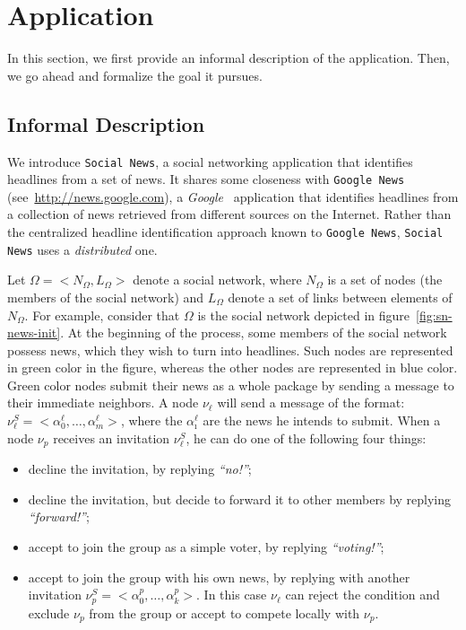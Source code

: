 \section{Application} %
\label{sec:application}

In this section, we first provide an informal description of the application. Then, we go ahead and formalize the goal it
pursues.

\subsection{Informal Description} %
\label{sub:informal_description}

We introduce {\tt Social News}, a social networking application that identifies headlines from a set of news. It shares
some closeness with {\tt Google News} (see~\url{http://news.google.com}), a \emph{Google~\texttrademark} application that
identifies headlines from a collection of news retrieved from different sources on the Internet. Rather than the
centralized headline identification approach known to {\tt Google News}, {\tt Social News} uses a \emph{distributed} one.

Let $\Omega=<N_\Omega,L_\Omega>$ denote a social network, where $N_\Omega$ is a set of nodes (the members of the social
network) and $L_\Omega$ denote a set of links between elements of $N_\Omega$. For example, consider that $\Omega$ is the
social network depicted in figure~\ref{fig:sn-news-init}. At the beginning of the process, some members of the social
network possess news, which they wish to turn into headlines. Such nodes are represented in green color in the figure,
whereas the other nodes are represented in blue color. Green color nodes submit their news as a whole package by sending
a message to their immediate neighbors. A node $\nu_\ell$ will send a message of the format:
$\nu_\ell^S=<\alpha_0^\ell,\ldots,\alpha_m^\ell>$, where the $\alpha_\imath^\ell$ are the news he intends to submit. When
a node $\nu_p$ receives an invitation $\nu_\ell^S$, he can do one of the following four things:

\begin{itemize} 
	\item decline the invitation, by replying \emph{``no!''};
	\item decline the invitation, but decide to forward it to other members by replying \emph{``forward!''};
	\item accept to join the group as a simple voter, by replying \emph{``voting!''}; 
	\item accept to join the group with his own news, by replying with another invitation $\nu_p^S=<\alpha_0^p,\ldots,\alpha_k^p>$. In this case $\nu_\ell$ can reject the condition and exclude $\nu_p$
from the group or accept to compete locally with $\nu_p$. 
\end{itemize}

